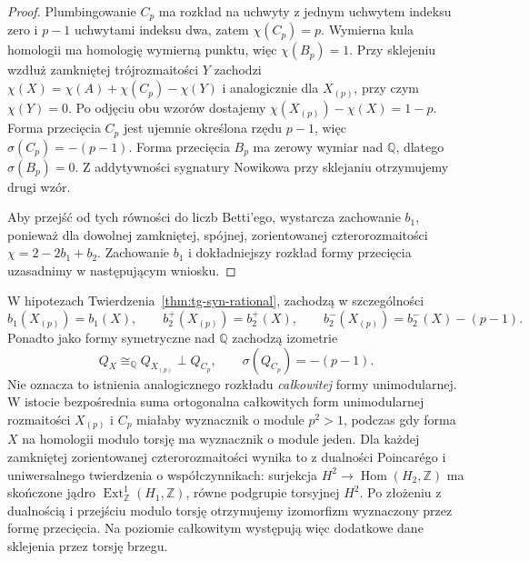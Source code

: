 \begin{proof}
Plumbingowanie $C_p$ ma rozkład na uchwyty z jednym uchwytem
indeksu zero i $p-1$ uchwytami indeksu dwa,
zatem $\chi(C_p)=p$. Wymierna kula homologii ma
homologię wymierną punktu, więc $\chi(B_p)=1$.
Przy sklejeniu wzdłuż zamkniętej trójrozmaitości $Y$
zachodzi $\chi(X)=\chi(A)+\chi(C_p)-\chi(Y)$ i analogicznie
dla $X_{(p)}$, przy czym $\chi(Y)=0$.
Po odjęciu obu wzorów dostajemy
$\chi(X_{(p)})-\chi(X)=1-p$.
Forma przecięcia $C_p$ jest ujemnie określona rzędu $p-1$,
więc $\sigma(C_p)=-(p-1)$. Forma przecięcia $B_p$
ma zerowy wymiar nad $\mathbb Q$, dlatego $\sigma(B_p)=0$.
Z addytywności sygnatury Nowikowa przy sklejaniu otrzymujemy
drugi wzór.

Aby przejść od tych równości do liczb Betti'ego,
wystarcza zachowanie $b_1$, ponieważ dla dowolnej
zamkniętej, spójnej, zorientowanej czterorozmaitości
$\chi=2-2b_1+b_2$.
Zachowanie $b_1$ i dokładniejszy rozkład formy
przecięcia uzasadnimy w następującym wniosku.
\end{proof}

\begin{wniosek}
\label{cor:tg-syn-rational-homological}
W hipotezach Twierdzenia~\ref{thm:tg-syn-rational},
zachodzą w szczególności
\[
 b_1(X_{(p)})=b_1(X),\qquad
 b_2^+(X_{(p)})=b_2^+(X),\qquad
 b_2^-(X_{(p)})=b_2^-(X)-(p-1).
\]
Ponadto jako formy symetryczne nad $\mathbb Q$
zachodzą izometrie
\[
 Q_X\cong_{\mathbb Q}Q_{X_{(p)}}\perp Q_{C_p},
 \qquad \sigma(Q_{C_p})=-(p-1).
\]
Nie oznacza to istnienia analogicznego rozkładu
\emph{całkowitej} formy unimodularnej.
W istocie bezpośrednia suma ortogonalna całkowitych
form unimodularnej rozmaitości $X_{(p)}$ i $C_p$
miałaby wyznacznik o module $p^2>1$,
podczas gdy forma $X$ na homologii modulo torsję
ma wyznacznik o module jeden. Dla każdej zamkniętej
zorientowanej czterorozmaitości wynika to z dualności
Poincarégo i uniwersalnego twierdzenia o współczynnikach:
surjekcja $H^2\to\operatorname{Hom}(H_2,\mathbb Z)$
ma skończone jądro $\operatorname{Ext}^1_{\mathbb Z}(H_1,\mathbb Z)$,
równe podgrupie torsyjnej $H^2$.
Po złożeniu z dualnością i przejściu modulo torsję
otrzymujemy izomorfizm wyznaczony przez formę przecięcia. Na poziomie
całkowitym występują więc dodatkowe dane
sklejenia przez torsję brzegu.
\end{wniosek}

